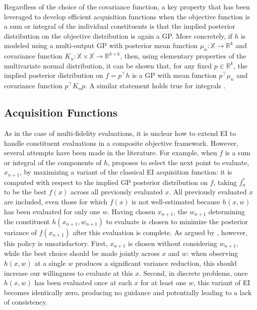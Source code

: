 \documentclass{wscpaperproc}
\newcommand{\R}{\mathbb{R}}
\newcommand{\X}{\mathbb{X}}
\theoremstyle{wsc}
\begin{document}
Regardless of the choice of the covariance function, a key property that has been leveraged to develop efficient acquisition functions when the objective function is a sum or integral of the individual constituents is that the implied posterior distribution on the objective distribution is again a GP. More concretely, if $h$ is modeled using a multi-output GP with posterior mean function $\mu_n:\X\rightarrow\R^k$ and covariance function $K_n:\X\times\X \rightarrow \R^{k\times k}$, then, using elementary properties of the multivariate normal distribution, it can be shown that, for any fixed $p\in\R^k$, the implied posterior distribution on $f = p^\top h$ is a GP with mean function $p^\top\mu_n$ and covariance function $p^\top K_n p$. A similar statement holds true for integrals .

\subsection{Acquisition Functions}
As in the case of multi-fidelity evaluations, it is unclear how to extend EI to handle constituent evaluations in a composite objective framework.
However, several  attempts have been made in the literature. For example, when $f$ is a sum or integral of the components of $h$,  proposes to select the next point to evaluate, $x_{n+1}$, by maximizing a variant of the classical EI acquisition function: it is computed with respect to the implied GP posterior distribution on $f$, taking $f^*_n$ to be the best $f(x)$ across all previously evaluated $x$. All previously evaluated $x$ are included, even those for which $f(x)$ is not well-estimated because $h(x,w)$ has been evaluated for only one $w$.
Having chosen $x_{n+1}$, the $w_{n+1}$ determining the constituent $h(x_{n+1},w_{n+1})$ to evaluate is chosen to minimize the posterior variance of $f(x_{n+1})$  after this evaluation is complete. As argued by , however, this policy is unsatisfactory.
First, $x_{n+1}$ is chosen without considering $w_{n+1}$, while the best choice should be made jointly across $x$ and $w$: when observing $h(x, w)$ at a single $w$ produces a significant variance reduction, this should increase our willingness to evaluate at this $x$.
Second, in discrete problems, once $h(x,w)$ has been evaluated once at each $x$ for at least one $w$, this variant of EI becomes identically zero, producing no guidance and potentially leading to a lack of consistency.
\end{document}
